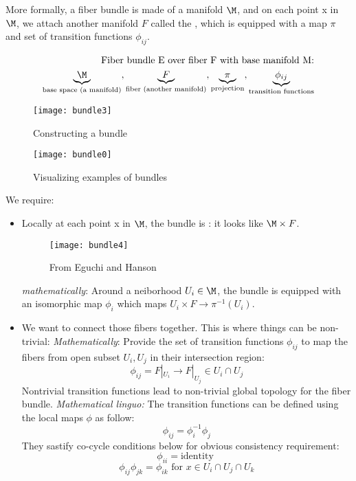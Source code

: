 \documentclass[11pt]{scrartcl}
\begin{document}
More formally, a fiber bundle is made of a  manifold $\M$, and on each point x in $\M$, we attach another manifold $F$ called the , which is equipped with a  map $\pi$ and set of transition functions $\phi_{ij}$.

\begin{align}
	\text{Fiber bundle E over fiber F with base manifold M:} \\ \underbrace{\M}_{\text{base space (a manifold)}} , \underbrace{F}_{\text{fiber (another manifold)}},  \underbrace{\pi}_{\text{projection}}, \underbrace{\phi_{ij}}_{\text{transition functions}} 
\end{align}

\begin{figure}[h!]
	\caption{Constructing a bundle}
	\texttt{[image: bundle3]}
\end{figure}

\begin{figure}[h!]
	\caption{ Visualizing examples of bundles}
	\texttt{[image: bundle0]}
\end{figure}


We require:
\begin{itemize}
	\item Locally at each point x in $\M$, the bundle is :
	it looks like $\M \times F$.
	\begin{figure}[h!]
		\caption{From Eguchi and Hanson}
		\texttt{[image: bundle4]}
	\end{figure}
	\emph{mathematically}: Around a neiborhood $U_i \in \M$, the bundle is equipped with an isomorphic map $\phi_i$ which maps $U_i \times F \rightarrow \pi^{-1}(U_i)$.
	\item We want to connect those fibers together.  This is where things can be non-trivial:
	\emph{Mathematically}: Provide the set of transition functions $\phi_{ij}$ to map the fibers from open subset $U_i, U_j$ in their intersection region:
	$$ \phi_{ij} = F|_{U_i} \rightarrow F|_{U_j} \in U_i \cap U_j$$
	Nontrivial transition functions lead to non-trivial global topology for the fiber bundle.
	\emph{Mathematical linguo:}  The transition functions can be defined using the local maps $\phi$ as follow:
	$$\phi_{ij} = \phi_i^{-1} \phi_j$$
	They sastify co-cycle conditions below for obvious consistency requirement:
	$$ \phi_{ii} = \text{identity }$$
	$$ \phi_{ij} \phi_{jk} = \phi_{ik} \text{ for } x \in U_i \cap U_j \cap U_k $$
\end{itemize}
\end{document}
